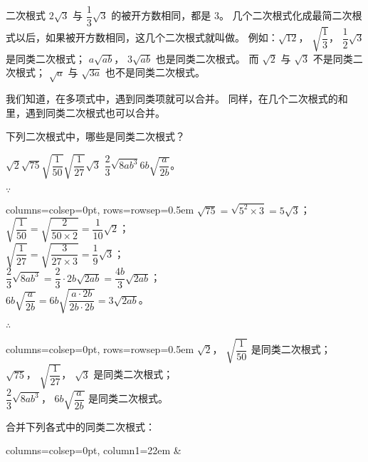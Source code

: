 \begin{enhancedline}
二次根式 $2\sqrt{3}$ 与 $\dfrac{1}{3}\sqrt{3}$ 的被开方数相同，都是 $3$。
几个二次根式化成最简二次根式以后，如果被开方数相同，这几个二次根式就叫做。
例如：$\sqrt{12}$， $\sqrt{\dfrac{1}{3}}$， $\dfrac{1}{2}\sqrt{3}$ 是同类二次根式；
$a\sqrt{ab}$， $3\sqrt{ab}$ 也是同类二次根式。
而 $\sqrt{2}$ 与 $\sqrt{3}$ 不是同类二次根式；
$\sqrt{a}$ 与 $\sqrt{3a}$ 也不是同类二次根式。

我们知道，在多项式中，遇到同类项就可以合并。
同样，在几个二次根式的和里，遇到同类二次根式也可以合并。

\liti 下列二次根式中，哪些是同类二次根式？

\hspace*{2em} $\sqrt{2}$\nsep $\sqrt{75}$\nsep $\sqrt{\dfrac{1}{50}}$\nsep $\sqrt{\dfrac{1}{27}}$\nsep $\sqrt{3}$\nsep
$\dfrac{2}{3}\sqrt{8ab^3}$\nsep $6b\sqrt{\dfrac{a}{2b}}$。

\jie $\because$ \quad \begin{tblr}[t]{columns={colsep=0pt}, rows={rowsep=0.5em}}
    $\sqrt{75} = \sqrt{5^2 \times 3} = 5\sqrt{3}$； \\
    $\sqrt{\dfrac{1}{50}} = \sqrt{\dfrac{2}{50 \times 2}} = \dfrac{1}{10}\sqrt{2}$； \\
    $\sqrt{\dfrac{1}{27}} = \sqrt{\dfrac{3}{27 \times 3}} = \dfrac{1}{9}\sqrt{3}$； \\
    $\dfrac{2}{3}\sqrt{8ab^3} = \dfrac{2}{3} \cdot 2b\sqrt{2ab} = \dfrac{4b}{3}\sqrt{2ab}$； \\
    $6b\sqrt{\dfrac{a}{2b}} = 6b\sqrt{\dfrac{a \cdot 2b}{2b \cdot 2b}} = 3\sqrt{2ab}$。
\end{tblr}

$\therefore$ \quad \begin{tblr}[t]{columns={colsep=0pt}, rows={rowsep=0.5em}}
    $\sqrt{2}$， $\sqrt{\dfrac{1}{50}}$ 是同类二次根式； \\
    $\sqrt{75}$， $\sqrt{\dfrac{1}{27}}$， $\sqrt{3}$ 是同类二次根式； \\
    $\dfrac{2}{3}\sqrt{8ab^3}$， $6b\sqrt{\dfrac{a}{2b}}$ 是同类二次根式。
\end{tblr}


\liti 合并下列各式中的同类二次根式：
\begin{xiaoxiaotis}

    \hspace*{1.5em} \begin{tblr}[t]{columns={colsep=0pt}, column{1}={22em}}
            & 
    \end{tblr}


\end{xiaoxiaotis}
\end{enhancedline}
